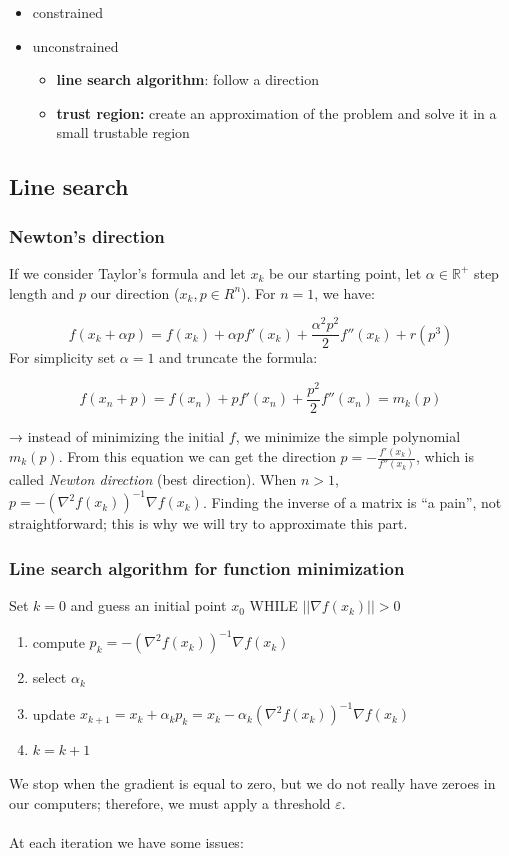 \begin{itemize}
\tightlist
\item
  constrained
\item
  unconstrained

  \begin{itemize}
  \tightlist
  \item
    \textbf{line search algorithm}: follow a direction
  \item
    \textbf{trust region:} create an approximation of the problem
    and solve it in a small trustable region
  \end{itemize}
\end{itemize}


\subsection{Line search}

\subsubsection{Newton's direction}

If we consider Taylor's formula and let $x_k$ be our starting point, let
$\alpha \in \mathbb{R}^+$ step length and $p$ our direction
($x_k, p \in R^n$). For $n=1$, we have:

$$
f(x_k+\alpha p)=f(x_k) + \alpha p f'(x_k) + \frac{\alpha^2p^2}{2} f''(x_k) + r(p^3)
$$
\noindent
For simplicity set $\alpha=1$ and truncate the formula:

$$
f(x_n+p)=f(x_n) + p f'(x_n) + \frac{p^2}{2} f''(x_n) = m_k(p)
$$

→ instead of minimizing the initial $f$, we minimize the simple
polynomial $m_k(p)$.
\noindent
From this equation we can get the direction
$p = -\frac{f'(x_k)}{f''(x_k)}$, which is called \emph{Newton direction}
(best direction). When $n>1$,
$p = -(\nabla^2 f(x_k))^{-1}\nabla f(x_k)$. Finding the inverse of a
matrix is ``a pain'', not straightforward; this is why we will try to
approximate this part.

\subsubsection{Line search algorithm for function minimization}

Set $k=0$ and guess an initial point $x_0$ WHILE $||\nabla f(x_k)||>0$

\begin{enumerate}
\def\labelenumi{\arabic{enumi}.}
\tightlist
\item
  compute $p_k=-(\nabla^2f(x_k))^{-1}\nabla f(x_k)$
\item
  select $\alpha_k$
\item
  update
  $x_{k+1}=x_k+\alpha_kp_k = x_k -\alpha_k(\nabla^2f(x_k))^{-1}\nabla f(x_k)$
\item
  $k=k+1$
\end{enumerate}
\noindent
We stop when the gradient is equal to zero, but we do not really have
zeroes in our computers; therefore, we must apply a threshold
$\varepsilon$.
\\
\\
\noindent
At each iteration we have some issues:

